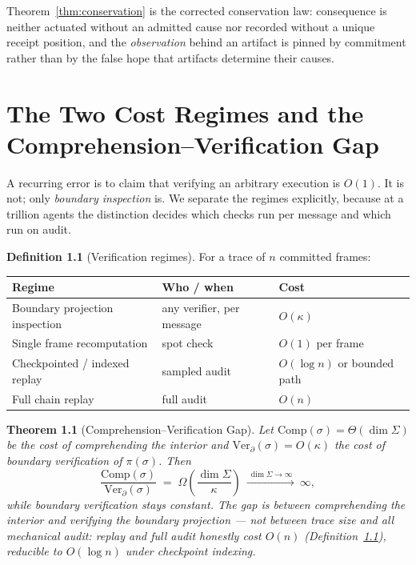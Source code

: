 \documentclass[11pt,oneside]{book}
\theoremstyle{definition}
\newtheorem{definition}{Definition}[chapter]
\theoremstyle{plain}
\newtheorem{theorem}{Theorem}[chapter]
\theoremstyle{remark}
\newcommand{\Proj}{\pi}                        %
\newcommand{\CL}{\kappa}                       %
\begin{document}
Theorem~\ref{thm:conservation} is the corrected conservation law: consequence is neither
actuated without an admitted cause nor recorded without a unique receipt position, and the
\emph{observation} behind an artifact is pinned by commitment rather than by the false hope
that artifacts determine their causes.

\chapter{The Two Cost Regimes and the Comprehension--Verification Gap}
\label{ch:cost}

A recurring error is to claim that verifying an arbitrary execution is $O(1)$. It is not;
only \emph{boundary inspection} is. We separate the regimes explicitly, because at a trillion
agents the distinction decides which checks run per message and which run on audit.

\begin{definition}[Verification regimes]\label{def:regimes}
For a trace of $n$ committed frames:
\begin{center}
\begin{tabular}{lll}
\toprule
Regime & Who / when & Cost\\
\midrule
Boundary projection inspection & any verifier, per message & $O(\CL)$\\
Single frame recomputation & spot check & $O(1)$ per frame\\
Checkpointed / indexed replay & sampled audit & $O(\log n)$ or bounded path\\
Full chain replay & full audit & $O(n)$\\
\bottomrule
\end{tabular}
\end{center}
\end{definition}

\begin{theorem}[Comprehension--Verification Gap]\label{thm:gap}
Let $\mathrm{Comp}(\sigma)=\Theta(\dim\Sigma)$ be the cost of comprehending the interior and
$\mathrm{Ver}_{\partial}(\sigma)=O(\CL)$ the cost of \emph{boundary} verification of
$\Proj(\sigma)$. Then
\[
\frac{\mathrm{Comp}(\sigma)}{\mathrm{Ver}_{\partial}(\sigma)} \;=\; \Omega\!\left(\frac{\dim\Sigma}{\CL}\right)\ \xrightarrow{\ \dim\Sigma\to\infty\ }\ \infty,
\]
while boundary verification stays constant. The gap is between \emph{comprehending the
interior} and \emph{verifying the boundary projection} --- \emph{not} between trace size and
all mechanical audit: replay and full audit honestly cost $O(n)$ (Definition~\ref{def:regimes}),
reducible to $O(\log n)$ under checkpoint indexing.
\end{theorem}
\end{document}
